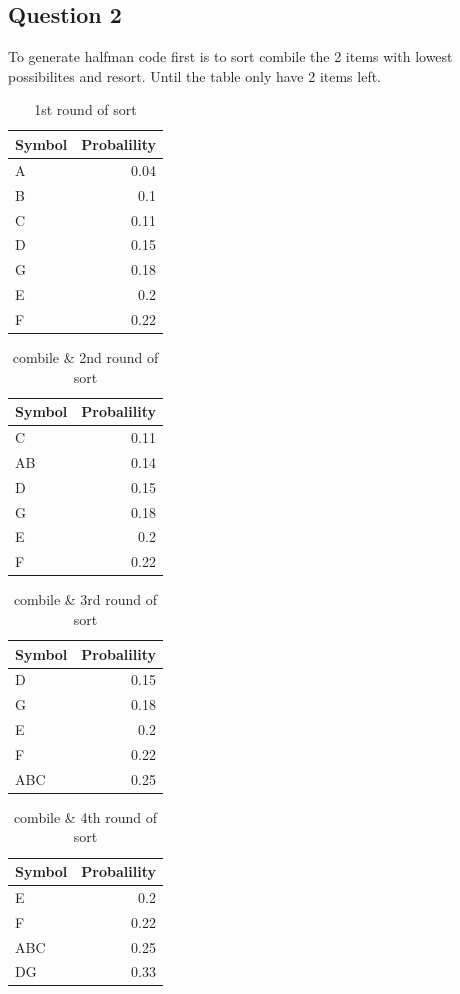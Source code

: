 \documentclass[titlepage]{article}
\begin{document}
\newpage

\subsection{Question 2}
\label{sec:orgdd45b35}

   To generate halfman code first is to sort combile the 2 items with lowest possibilites and resort. Until the table only have 2
items left.

\begin{table}[htbp]
\caption{1st round of sort}
\centering
\begin{tabular}{lr}
Symbol & Probalility\\
\hline
A & 0.04\\
B & 0.1\\
C & 0.11\\
D & 0.15\\
G & 0.18\\
E & 0.2\\
F & 0.22\\
\end{tabular}
\end{table}


\begin{table}[htbp]
\caption{combile \& 2nd round of sort}
\centering
\begin{tabular}{lr}
Symbol & Probalility\\
\hline
C & 0.11\\
AB & 0.14\\
D & 0.15\\
G & 0.18\\
E & 0.2\\
F & 0.22\\
\end{tabular}
\end{table}

\begin{table}[htbp]
\caption{\label{fig:label}combile \& 3rd round of sort}
\centering
\begin{tabular}{lr}
Symbol & Probalility\\
\hline
D & 0.15\\
G & 0.18\\
E & 0.2\\
F & 0.22\\
ABC & 0.25\\
\end{tabular}
\end{table}

\begin{table}[htbp]
\caption{\label{fig:label}combile \& 4th round of sort}
\centering
\begin{tabular}{lr}
Symbol & Probalility\\
\hline
E & 0.2\\
F & 0.22\\
ABC & 0.25\\
DG & 0.33\\
\end{tabular}
\end{table}
\end{document}
